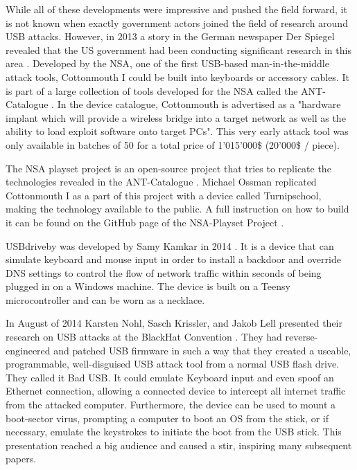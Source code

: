 While all of these developments were impressive and pushed the field forward, it is not known when exactly government actors joined the field of research around USB attacks. However, in 2013 a story in the German newspaper Der Spiegel revealed that the US government had been conducting significant research in this area \cite{appelbaumCatalogRevealsNSA2013}. Developed by the NSA, one of the first USB-based man-in-the-middle attack tools, Cottonmouth I could be built into keyboards or accessory cables. It is part of a large collection of tools developed for the NSA called the ANT-Catalogue \cite{InteractiveGraphicNSA}. In the device catalogue, Cottonmouth is advertised as a "hardware implant which will provide a wireless bridge into a target network as well as the ability to load exploit software onto target PCs". This very early attack tool was only available in batches of 50 for a total price of 1'015'000\$ (20'000\$ / piece).

The NSA playset project is an open-source project that tries to replicate the technologies revealed in the ANT-Catalogue \cite{NSAPlaysetTurnipschoolHtml}. Michael Ossman replicated Cottonmouth I as a part of this project with a device called Turnipschool, making the technology available to the public. A full instruction on how to build it can be found on the GitHub page of the NSA-Playset Project \cite{NSAPlaysetTurnipschoolHtml}.

USBdriveby was developed by Samy Kamkar in 2014 \cite{SamyKamkarUSBdriveby}. It is a device that can simulate keyboard and mouse input in order to install a backdoor and override DNS settings to control the flow of network traffic within seconds of being plugged in on a Windows machine. The device is built on a Teensy microcontroller and can be worn as a necklace.

In August of 2014 Karsten Nohl, Sasch Krissler, and Jakob Lell presented their research on USB attacks at the BlackHat Convention \cite{Srlabsbadusbblackhatv1Pdf2014}. They had reverse-engineered and patched USB firmware in such a way that they created a useable, programmable, well-disguised USB attack tool from a normal USB flash drive. They called it Bad USB. It could emulate Keyboard input and even spoof an Ethernet connection, allowing a connected device to intercept all internet traffic from the attacked computer. Furthermore, the device can be used to mount a boot-sector virus, prompting a computer to boot an OS from the stick, or if necessary, emulate the keystrokes to initiate the boot from the USB stick. This presentation reached a big audience and caused a stir, inspiring many subsequent papers.

